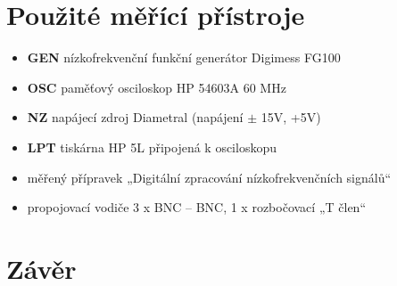 \documentclass[a4paper, czech]{article}
\begin{document}
\section{Použité měřící přístroje}

\begin{itemize}
    \item \textbf{GEN} nízkofrekvenční funkční generátor Digimess FG100
    \item \textbf{OSC} paměťový osciloskop HP 54603A 60 MHz
    \item \textbf{NZ} napájecí zdroj Diametral (napájení $\pm$ 15V, +5V)
    \item \textbf{LPT} tiskárna HP 5L připojená k osciloskopu
    \item měřený přípravek „Digitální zpracování nízkofrekvenčních signálů“
    \item propojovací vodiče 3 x BNC – BNC, 1 x rozbočovací „T člen“
\end{itemize}

\section{Závěr}
\end{document}
